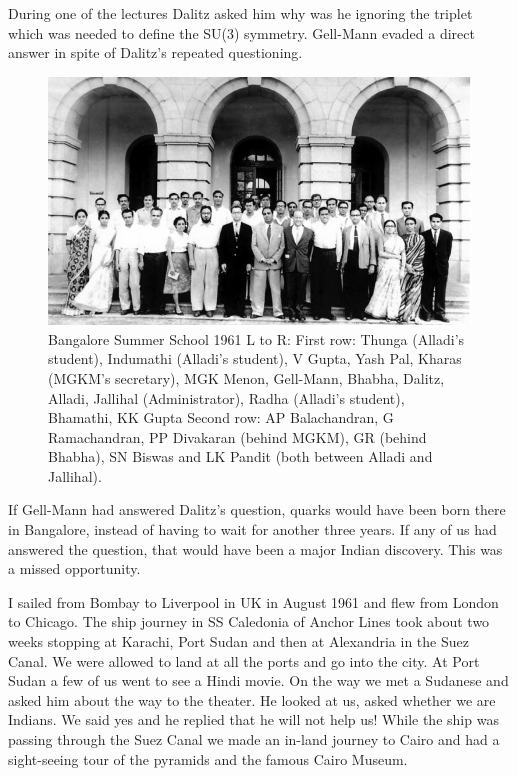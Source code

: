 During one of the lectures Dalitz asked him why was he igno\-ring the 
triplet which was needed to define the SU(3) symmetry. Gell-Mann evaded 
a direct answer in spite of Dalitz's repeated questioning.

\begin{figure}[h]
\centering
\includegraphics[width=\textwidth]{images/Rajaji-gellmann.jpg}
\caption{\small{Bangalore Summer School 1961 L to R: First row: Thunga (Alladi's student), Indumathi (Alladi's student), V Gupta, Yash Pal, Kharas (MGKM's secretary), MGK Menon, Gell-Mann, Bhabha, Dalitz, Alladi, Jallihal (Administrator), Radha (Alladi's student), Bhamathi, KK Gupta Second row: AP Balachandran, G Ramachandran, PP Divakaran (behind MGKM), GR (behind Bhabha), SN Biswas and LK Pandit (both between Alladi and Jallihal)}.}
\end{figure}
 
If Gell-Mann had answered Dalitz's question, quarks would have been born 
there in Bangalore, instead of having to wait for another three years. 
If any of us had answered the question, that would have been a major 
Indian discovery. This was a missed opportunity.

I sailed from Bombay to Liverpool in UK in August 1961 and flew from 
London to Chicago. The ship journey in SS Caledonia of Anchor Lines took 
about two weeks stopping at Karachi, Port Sudan and then at Alexandria 
in the Suez Canal. We were allo\-wed to land at all the ports and go into 
the city. At Port Sudan a few of us went to see a Hindi movie. On the 
way we met a Sudanese and asked him about the way to the theater. He 
looked at us, asked whether we are Indians. We said yes and he replied 
that he will not help us! While the ship was passing through the Suez 
Canal we made an in-land journey to Cairo and had a sight-seeing tour of 
the pyramids and the famous Cairo Museum.

